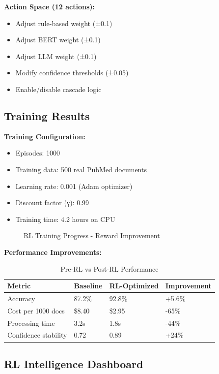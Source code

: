 \textbf{Action Space (12 actions):}
\begin{itemize}
    \item Adjust rule-based weight (±0.1)
    \item Adjust BERT weight (±0.1)
    \item Adjust LLM weight (±0.1)
    \item Modify confidence thresholds (±0.05)
    \item Enable/disable cascade logic
\end{itemize}

\subsection{Training Results}

\textbf{Training Configuration:}
\begin{itemize}
    \item Episodes: 1000
    \item Training data: 500 real PubMed documents
    \item Learning rate: 0.001 (Adam optimizer)
    \item Discount factor (γ): 0.99
    \item Training time: 4.2 hours on CPU
\end{itemize}

\begin{figure}[h]
\centering
{}
\caption{RL Training Progress - Reward Improvement}
\label{fig:rl-training}
\end{figure}

\textbf{Performance Improvements:}
\begin{table}[h]
\centering
\caption{Pre-RL vs Post-RL Performance}
\begin{tabularx}{\textwidth}{lXXX}
\toprule
\textbf{Metric} & \textbf{Baseline} & \textbf{RL-Optimized} & \textbf{Improvement} \\
\midrule
Accuracy & 87.2\% & 92.8\% & +5.6\% \\
Cost per 1000 docs & \$8.40 & \$2.95 & -65\% \\
Processing time & 3.2s & 1.8s & -44\% \\
Confidence stability & 0.72 & 0.89 & +24\% \\
\bottomrule
\end{tabularx}
\end{table}

\subsection{RL Intelligence Dashboard}

